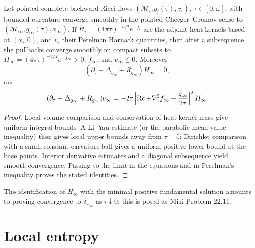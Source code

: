 \begin{lemma}
\label{lem:chow-iii-heat-kernel-cheeger-gromov}
Let pointed complete backward Ricci flows \((\mathcal M_i,g_i(\tau),x_i)\),
\(\tau\in[0,\omega]\), with bounded curvature converge smoothly in the pointed
Cheeger--Gromov sense to \((\mathcal M_\infty,g_\infty(\tau),x_\infty)\).  If
\(H_i=(4\pi\tau)^{-n/2}e^{-f_i}\) are the adjoint heat kernels based at
\((x_i,0)\), and \(v_i\) their Perelman Harnack quantities, then after a
subsequence the pullbacks converge smoothly on compact subsets to
\(H_\infty=(4\pi\tau)^{-n/2}e^{-f_\infty}>0\), \(f_\infty\), and \(v_\infty\le0\).
Moreover
\[
 (\partial_\tau-\Delta_{g_\infty}+R_{g_\infty})H_\infty=0,
\]
and
\[
 (\partial_\tau-\Delta_{g_\infty}+R_{g_\infty})v_\infty
 =-2\tau\left|\operatorname{Rc}+\nabla^2f_\infty-\frac{g_\infty}{2\tau}\right|^2H_\infty.
\]
\end{lemma}
\begin{proof}
Local volume comparison and conservation of heat-kernel mass give uniform
integral bounds.  A Li--Yau estimate (or the parabolic mean-value inequality)
then gives local upper bounds away from \(\tau=0\); Dirichlet comparison with
a small constant-curvature ball gives a uniform positive lower bound at the
base points.  Interior derivative estimates and a diagonal subsequence yield
smooth convergence.  Passing to the limit in the equations and in
Perelman's inequality proves the stated identities.
\end{proof}

\begin{remark}
\label{rem:chow-iii-heat-kernel-minimality}
The identification of \(H_\infty\) with the minimal positive fundamental
solution amounts to proving convergence to \(\delta_{x_\infty}\) as
\(\tau\downarrow0\); this is posed as Mini-Problem 22.11.
\end{remark}

\section{Local entropy}

